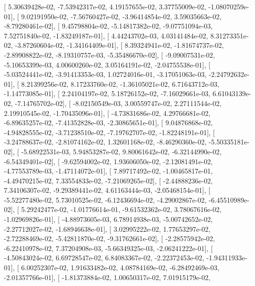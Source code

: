 \documentclass{article}
\begin{document}
       [  5.30639428e-02,  -7.53942317e-02,   4.19157655e-02,
          3.37755009e-02,  -1.08070259e-01],
       [  9.02191950e-02,  -7.56760427e-02,  -3.96414854e-02,
          3.59035663e-02,  -8.79280461e-02],
       [  9.45798804e-02,  -5.14817382e-02,  -9.07751094e-03,
          7.52751840e-02,  -1.83249187e-01],
       [  4.44243702e-03,   4.03141484e-02,   8.31273351e-02,
         -3.87260604e-02,  -1.34164409e-01],
       [  8.39324941e-02,  -1.81674737e-02,  -2.89908822e-02,
         -8.19310757e-03,  -5.35486670e-02],
       [ -9.09007531e-02,  -5.10653399e-03,   4.00600260e-02,
          3.05164191e-02,  -2.04755538e-01],
       [ -5.03524441e-02,  -3.91413353e-03,   1.02724016e-01,
         -3.17051063e-03,  -2.24792632e-01],
       [  8.21399256e-02,   8.17233760e-02,  -1.36105021e-02,
          6.71643712e-03,  -1.14773085e-01],
       [  2.24104197e-02,   5.18726152e-02,  -7.16029661e-03,
          6.61043139e-02,  -7.14765702e-02],
       [ -8.02150549e-03,   3.00559747e-02,   2.27111544e-02,
          2.19910545e-02,  -1.70435096e-01],
       [ -4.73831686e-02,   4.29766681e-02,  -6.89635257e-02,
         -7.41352828e-03,  -2.30865651e-01],
       [  9.04876868e-02,  -4.94828555e-02,  -3.71238510e-02,
         -7.19762707e-02,  -1.82248191e-01],
       [ -3.24788637e-02,  -2.81074162e-02,   1.32601168e-02,
         -8.46290360e-02,  -5.50335181e-02],
       [ -5.68922531e-03,   5.94853287e-02,   9.80061642e-02,
         -6.32144990e-02,  -6.54349401e-02],
       [ -9.62594002e-02,   1.93606050e-02,  -2.12081491e-02,
         -4.77553789e-03,  -1.47114072e-01],
       [  7.89717492e-02,  -1.00465817e-01,  -4.49470215e-02,
          7.33554833e-02,  -7.21069265e-02],
       [ -2.44888236e-02,   7.34106307e-02,  -9.29389441e-02,
          4.61163444e-03,  -2.05468154e-01],
       [ -5.52277480e-02,   5.73010525e-02,  -6.12436694e-02,
         -4.29002867e-02,  -6.45510989e-02],
       [  5.29242477e-02,  -1.01776614e-01,  -9.61532362e-02,
          3.78067616e-02,  -1.02969826e-01],
       [ -4.88973605e-03,   6.78914938e-03,  -5.00742652e-02,
         -2.27712027e-02,  -1.68946638e-01],
       [  3.02995222e-02,   1.77653297e-02,  -2.72288469e-02,
         -5.42811870e-02,  -9.31762661e-02],
       [ -2.28575942e-02,  -6.22410978e-02,   7.37204908e-03,
         -5.66349325e-03,  -2.06241222e-01],
       [ -4.50843024e-02,   6.69728547e-02,   6.84083367e-02,
         -2.22372453e-02,  -1.94311933e-01],
       [  6.00252307e-02,   1.91633482e-02,   4.08784169e-02,
         -6.28492469e-03,  -2.01357766e-01],
       [ -1.81373884e-02,   1.00650317e-02,   7.01915179e-02,
\end{document}
